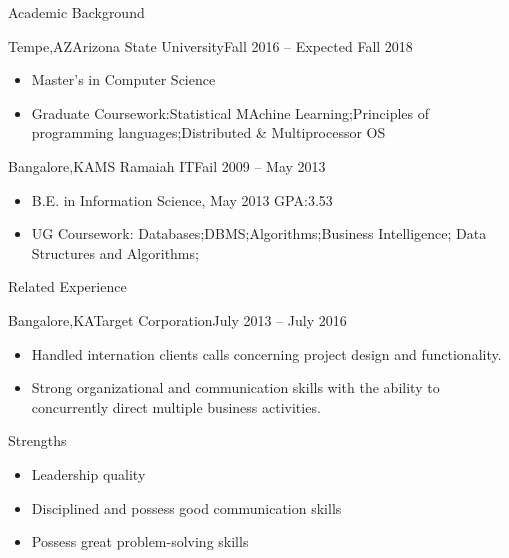 \documentclass[]{nakulcv}
\begin{document}
	\begin{cvsection}{Academic Background}
		\begin{cvsubsection}{Tempe,AZ}{Arizona State University}{Fall 2016 -- Expected Fall 2018}
			\begin{itemize}
				\item	Master's in Computer Science  
				\item Graduate Coursework:Statistical MAchine Learning;Principles of programming languages;Distributed \& Multiprocessor OS
			\end{itemize}
		\end{cvsubsection}
		\begin{cvsubsection}{Bangalore,KA}{MS Ramaiah IT}{Fail 2009 -- May 2013}
			\begin{itemize}
				\item B.E. in Information Science, May 2013 GPA:3.53
				\item UG Coursework: Databases;DBMS;Algorithms;Business Intelligence; Data Structures and Algorithms;
			\end{itemize}
		\end{cvsubsection}
	\end{cvsection}
	\begin{cvsection}{Related Experience}
		\begin{cvsubsection}{Bangalore,KA}{Target Corporation}{July 2013 -- July 2016}
			\begin{itemize}
				\item Handled internation clients calls concerning project design and functionality.
				\item Strong organizational and communication skills with the ability to concurrently direct multiple business activities.
			\end{itemize}
		\end{cvsubsection}
	\end{cvsection}
	\begin{cvsection}{Strengths}
		\begin{cvsubsection}{}{}{}
		\begin{itemize}
			\item Leadership quality
			\item Disciplined and possess good communication skills
			\item Possess great problem-solving skills
		\end{itemize}
	\end{cvsubsection}
	\end{cvsection}
\end{document}
